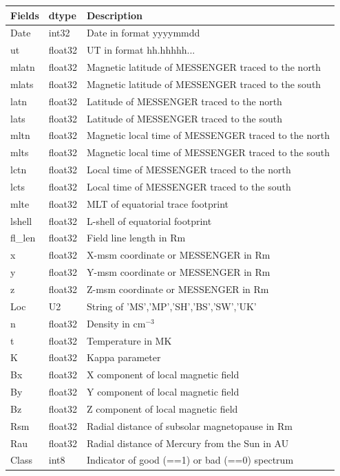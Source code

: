 	\begin{tabular}{|l|l|l|}
		\hline
		Fields & dtype & Description \\
		\hline
		Date & int32 & Date in format yyyymmdd \\
		ut & float32 & UT in format hh.hhhhh... \\
		mlatn & float32 & Magnetic latitude of MESSENGER traced to the north \\
		mlats & float32 & Magnetic latitude of MESSENGER traced to the south \\
		latn & float32 & Latitude of MESSENGER traced to the north \\
		lats & float32 & Latitude of MESSENGER traced to the south \\
		mltn & float32 & Magnetic local time of MESSENGER traced to the north \\
		mlts & float32 & Magnetic local time of MESSENGER traced to the south \\
		lctn & float32 & Local time of MESSENGER traced to the north \\
		lcts & float32 & Local time of MESSENGER traced to the south \\
		mlte & float32 & MLT of equatorial trace footprint \\
		lshell & float32 & L-shell of equatorial footprint \\
		fl\_len & float32 & Field line length in Rm \\
		x & float32 & X-msm coordinate or MESSENGER in Rm \\
		y & float32 & Y-msm coordinate or MESSENGER in Rm \\
		z & float32 & Z-msm coordinate or MESSENGER in Rm \\
		Loc & U2 & String of 'MS','MP','SH','BS','SW','UK' \\
		n & float32 & Density in cm\(^{-3}\) \\
		t & float32 & Temperature in MK \\
		K & float32 & Kappa parameter \\
		Bx & float32 & X component of local magnetic field \\
		By & float32 & Y component of local magnetic field \\
		Bz & float32 & Z component of local magnetic field \\
		Rsm & float32 & Radial distance of subsolar magnetopause in Rm \\
		Rau & float32 & Radial distance of Mercury from the Sun in AU \\
		Class & int8 & Indicator of good (==1) or bad (==0) spectrum \\
		\hline
	\end{tabular}
	
